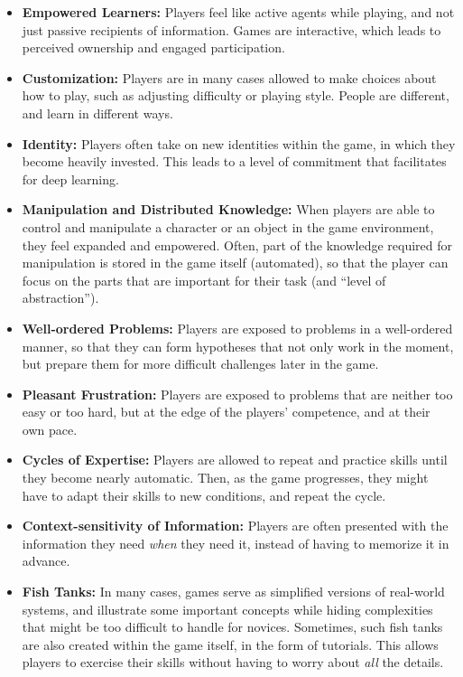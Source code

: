 \begin{itemize}
	\item{\textbf{Empowered Learners:}} Players feel like active agents while playing, and not just passive recipients of information. Games are interactive, which leads to perceived ownership and engaged participation.
	\item{\textbf{Customization:}} Players are in many cases allowed to make choices about how to play, such as adjusting difficulty or playing style. People are different, and learn in different ways.
	\item{\textbf{Identity:}} Players often take on new identities within the game, in which they become heavily invested. This leads to a level of commitment that facilitates for deep learning.
	\item{\textbf{Manipulation and Distributed Knowledge:}} When players are able to control and manipulate a character or an object in the game environment, they feel expanded and empowered. Often, part of the knowledge required for manipulation is stored in the game itself (automated), so that the player can focus on the parts that are important for their task (and ``level of abstraction'').
	\item{\textbf{Well-ordered Problems:}} Players are exposed to problems in a well-ordered manner, so that they can form hypotheses that not only work in the moment, but prepare them for more difficult challenges later in the game.
	\item{\textbf{Pleasant Frustration:}} Players are exposed to problems that are neither too easy or too hard, but at the edge of the players' competence, and at their own pace.
	\item{\textbf{Cycles of Expertise:}} Players are allowed to repeat and practice skills until they become nearly automatic. Then, as the game progresses, they might have to adapt their skills to new conditions, and repeat the cycle.
	\item{\textbf{Context-sensitivity of Information:}} Players are often presented with the information they need \emph{when} they need it, instead of having to memorize it in advance.
	\item{\textbf{Fish Tanks:}} In many cases, games serve as simplified versions of real-world systems, and illustrate some important concepts while hiding complexities that might be too difficult to handle for novices. Sometimes, such fish tanks are also created within the game itself, in the form of tutorials. This allows players to exercise their skills without having to worry about \emph{all} the details.

\end{itemize}
